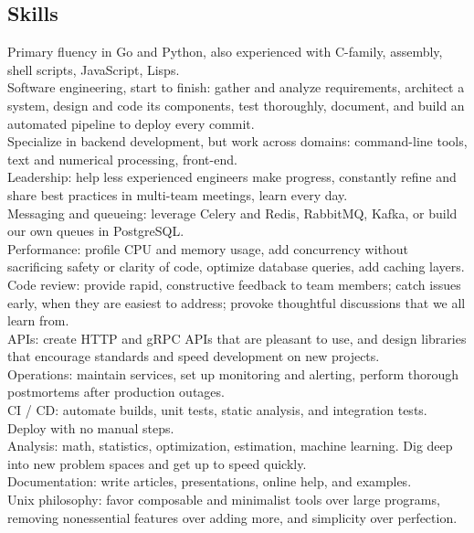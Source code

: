 \documentclass[12pt]{report}
\makeatletter
\renewcommand{\bullet}{$\vcenter{\hbox{~\huge$\cdot$~}}$}
\newenvironment{bullets}
{\tabularx{\textwidth}{ @{\bullet} X @{} }}
{\endtabularx}
\makeatother
\begin{document}
\subsection*{Skills}
\begin{bullets}
Primary fluency in Go and Python, also experienced with C-family, assembly, shell scripts, JavaScript, Lisps. \\
Software engineering, start to finish: gather and analyze requirements, architect a system, design and code its components, test thoroughly, document, and build an automated pipeline to deploy every commit. \\
Specialize in backend development, but work across domains: command-line tools, text and numerical processing, front-end. \\
Leadership: help less experienced engineers make progress, constantly refine and share best practices in multi-team meetings, learn every day. \\
Messaging and queueing: leverage Celery and Redis, RabbitMQ, Kafka, or build our own queues in PostgreSQL. \\
Performance: profile CPU and memory usage, add concurrency without sacrificing safety or clarity of code, optimize database queries, add caching layers. \\
Code review: provide rapid, constructive feedback to team members; catch issues early, when they are easiest to address; provoke thoughtful discussions that we all learn from. \\
APIs: create HTTP and gRPC APIs that are pleasant to use, and design libraries that encourage standards and speed development on new projects. \\
Operations: maintain services, set up monitoring and alerting, perform thorough postmortems after production outages. \\
CI / CD: automate builds, unit tests, static analysis, and integration tests. Deploy with no manual steps. \\ 
Analysis: math, statistics, optimization, estimation, machine learning. Dig deep into new problem spaces and get up to speed quickly. \\
Documentation: write articles, presentations, online help, and examples. \\
Unix philosophy: favor composable and minimalist tools over large programs, removing nonessential features over adding more, and simplicity over perfection. \\
\end{bullets}
\end{document}
